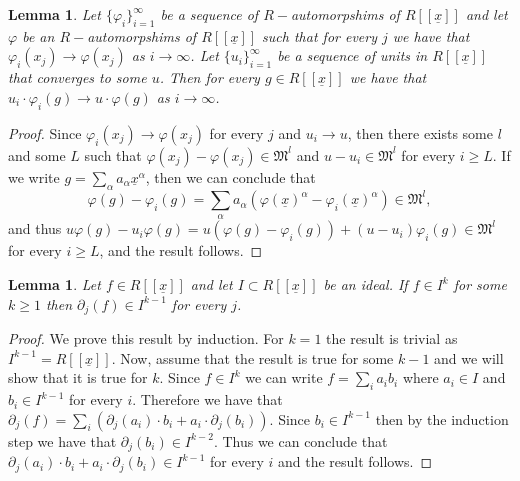\documentclass{article}
\newtheorem{lemma}[theorem]{Lemma}
\DeclareMathOperator{\ord}{ord}
\numberwithin{theorem}{section}
\begin{document}
\begin{lemma}\label{lem:app_limit}
    Let $\{\varphi_i\}_{i=1} ^\infty$ be a sequence of $R-$automorpshims of $R[[\underline{x}]]$ and let $\varphi$ be an $R-$automorpshims of $R[[\underline{x}]]$ such that for every $j$ we have that $\varphi_i(x_j) \to \varphi(x_j)$ as $i \to \infty$. Let $\{u_i\}_{i=1} ^\infty$ be a sequence of units in $R[[\underline{x}]]$ that converges to some $u$. Then for every $g \in R[[\underline{x}]]$ we have that $u_i \cdot \varphi_i(g) \to u\cdot \varphi(g)$ as $i \to \infty$.
\end{lemma}

\begin{proof}
    Since $\varphi_i(x_j) \to \varphi(x_j)$ for every $j$ and $u_i \to u$, then there exists some $l$ and some $L$ such that $\varphi(x_j)-\varphi(x_j) \in \mathfrak{M}^l$ and $u-u_i \in \mathfrak{M}^l$ for every $i \geq L$. If we write $g=\sum_{\alpha} a_{\alpha}\underline{x}^{\alpha}$, then we can conclude that 
    \begin{equation*}
        \varphi(g)-\varphi_i(g)=\sum_{\alpha} a_{\alpha} (\varphi(\underline{x})^{\alpha} - \varphi_i(\underline{x})^{\alpha}) \in \mathfrak{M}^l,
    \end{equation*}
    \noindent and thus $u\varphi(g)-u_i\varphi(g)=u(\varphi(g)-\varphi_i(g)) + (u-u_i)\varphi_i(g) \in \mathfrak{M}^l$ for every $i \geq L$, and the result follows. 
\end{proof}

\begin{lemma}\label{lem:app_ord_der}
    Let $f \in R[[\underline{x}]]$ and let $I \subset R[[\underline{x}]]$ be an ideal. If $f \in I^k$ for some $k\geq 1$ then $\partial_j(f) \in I^{k-1}$ for every $j$. 
\end{lemma}

\begin{proof}
    We prove this result by induction. For $k=1$ the result is trivial as $I^{k-1}=R[[\underline{x}]]$. Now, assume that the result is true for some $k-1$ and we will show that it is true for $k$. Since $f \in I^k$ we can write $f = \sum_i a_i b_i$ where $a_i \in I$ and $b_i \in I^{k-1}$ for every $i$. Therefore we have that $\partial_j(f)=\sum_i (\partial_j(a_i)\cdot b_i + a_i \cdot \partial_j(b_i))$. Since $b_i \in I^{k-1}$ then by the induction step we have that $\partial_j(b_i) \in I^{k-2}$. Thus we can conclude that $\partial_j(a_i)\cdot b_i + a_i \cdot \partial_j(b_i) \in I^{k-1}$ for every $i$ and the result follows. 
\end{proof}
\end{document}
